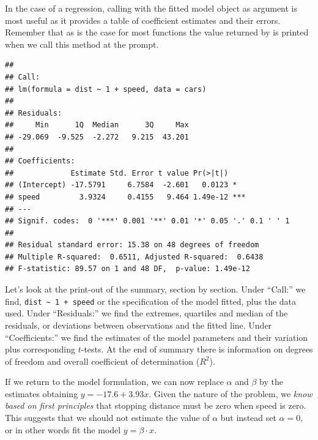 \documentclass[krantz2]{krantz}\usepackage{knitr}%
\begin{document}
In the case of a regression, calling  with the fitted model object as argument is most useful as it provides a table of coefficient estimates and their errors. Remember that as is the case for most \Rlang functions the value returned by  is printed when we call this method at the \Rlang prompt.

\begin{knitrout}\footnotesize
{}\color{fgcolor}\begin{kframe}
\begin{alltt}
\end{alltt}
\begin{verbatim}
## 
## Call:
## lm(formula = dist ~ 1 + speed, data = cars)
## 
## Residuals:
##     Min      1Q  Median      3Q     Max 
## -29.069  -9.525  -2.272   9.215  43.201 
## 
## Coefficients:
##             Estimate Std. Error t value Pr(>|t|)    
## (Intercept) -17.5791     6.7584  -2.601   0.0123 *  
## speed         3.9324     0.4155   9.464 1.49e-12 ***
## ---
## Signif. codes:  0 '***' 0.001 '**' 0.01 '*' 0.05 '.' 0.1 ' ' 1
## 
## Residual standard error: 15.38 on 48 degrees of freedom
## Multiple R-squared:  0.6511,	Adjusted R-squared:  0.6438 
## F-statistic: 89.57 on 1 and 48 DF,  p-value: 1.49e-12
\end{verbatim}
\end{kframe}
\end{knitrout}

Let's look at the print-out of the summary, section by section. Under ``Call:'' we find, \verb|dist ~ 1 + speed| or the specification of the model fitted, plus the data used. Under ``Residuals:'' we find the extremes, quartiles and median of the residuals, or deviations between observations and the fitted line. Under ``Coefficients:'' we find the estimates of the model parameters and their variation plus corresponding $t$-tests. At the end of summary there is information on degrees of freedom and overall coefficient of determination ($R^2$).

If we return to the model formulation, we can now replace $\alpha$ and $\beta$ by the estimates obtaining $y = -17.6 + 3.93 x$. Given the nature of the problem, we \emph{know based on first principles} that stopping distance must be zero when speed is zero. This suggests that we should not estimate the value of $\alpha$ but instead set $\alpha = 0$, or in other words fit the model $y = \beta \cdot x$.
\end{document}
